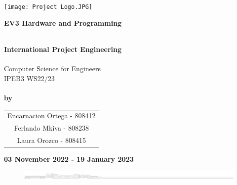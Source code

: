 
\begin{titlepage}
		
\centering
~\\~\\
\texttt{[image: Project Logo.JPG]}
\\[1.5cm]

\begin{center}
\Large\textbf{EV3 Hardware and Programming}\par
~\\
\textbf{\large{International Project Engineering}}\\
~\\
\large{Computer Science for Engineers}\\
\large{IPEB3 WS22/23 }\\
~\\
\large	\textbf{by}\\[0.5cm]
\begin{threeparttable}
	\begin{tabular}{c}
		Encarnacion Ortega - 808412 \\
		Ferlando Mkiva - 808238 \\
		Laura Orozco - 808415\\[0.5cm]
		\end{tabular}	
\end{threeparttable}
\end{center}
\textbf{03 November 2022 - 19 January 2023}

\vfill

\begin{figure}[b]
	\includegraphics[width=\linewidth]{Graphics/bottomLogo}
\end{figure}

\end{titlepage}	
\restoregeometry 